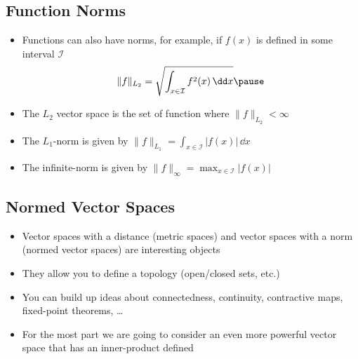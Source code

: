 
\begin{slide}
\section[-1]{Function Norms}

\begin{PauseHighLight}
  \begin{itemize}
  \item Functions can also have norms, for example, if $f(x)$ is defined
    in some interval $\mathcal{I}$ {\small
    \begin{align*}
      \| f \|_{L_2} = \sqrt{\int_{x\in\mathcal{I}} f^2(x) \, \dd x}\pause
    \end{align*}}
  \item The $L_2$ vector space is the set of function where $\|
    f \|_{L_2}<\infty$\pause
  \item The $L_1$-norm is given by
    $\| f \|_{L_1} = \int_{x\in\mathcal{I}} |f(x)| \, \dd x$\pause
  \item The infinite-norm is given by
    $\| f \|_{\infty} = \max_{x\in\mathcal{I}} |f(x)|$\pause
  \end{itemize}
\end{PauseHighLight}

\end{slide}


\begin{slide}
\section{Normed Vector Spaces}

\begin{PauseHighLight}
  \begin{itemize}
  \item Vector spaces with a distance (metric spaces) and vector spaces
    with a norm (normed vector spaces) are interesting objects\pause
  \item They allow you to define a topology (open/closed sets, etc.)\pause
  \item You can build up ideas about connectedness, continuity,
    contractive maps, fixed-point theorems, \ldots\pause
  \item For the most part we are going to consider an even more powerful
    vector space that has an inner-product defined\pause
  \end{itemize}
\end{PauseHighLight}

\end{slide}



